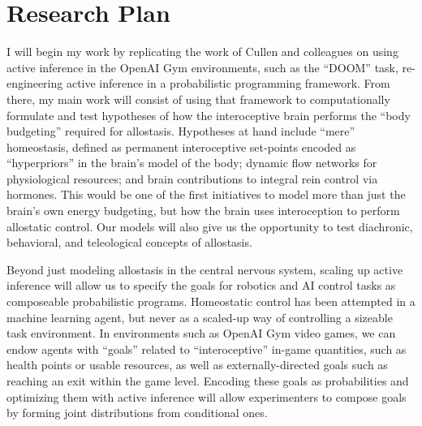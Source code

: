 
\section*{Research Plan}
\begin{singlespace}
\im
I will begin my work by replicating the work of Cullen and colleagues on
using active inference in the OpenAI Gym environments, such as the ``DOOM''
task\cite{Cullen2018}, re-engineering active inference in a probabilistic
programming framework.  From there, my main work will consist of using that
framework to computationally formulate and test hypotheses of how the
interoceptive brain performs the ``body budgeting'' required for allostasis.
Hypotheses at hand include ``mere'' homeostasis, defined as permanent
interoceptive set-points encoded as ``hyperpriors'' in the brain's model of
the body\cite{Morville2018a}; dynamic flow networks for physiological
resources; and brain contributions to integral rein control via hormones\cite{SAUNDERS1998}.  This would be one
of the first initiatives to model more than just the brain's own energy
budgeting, but how the brain uses interoception to perform allostatic
control\cite{Sterling2012,Sterling2015,Christie2015}.  Our models will
also give us the opportunity to test diachronic, behavioral, and teleological
concepts of allostasis\cite{Corcoran2017}.
\end{singlespace}

\begin{singlespace}
\im
Beyond just modeling allostasis in the central nervous system, scaling
up active inference will allow us to specify the goals for robotics and AI
control tasks as composeable probabilistic programs.  Homeostatic control has
been attempted in a machine learning agent, but never as a scaled-up way
of controlling a sizeable task environment\cite{Penny}.  In environments such
as OpenAI Gym video games, we can endow agents with ``goals'' related to
``interoceptive'' in-game quantities, such as health points or usable
resources, as well as externally-directed goals such as reaching an exit
within the game level.  Encoding these goals as probabilities and optimizing
them with active inference will allow experimenters to compose goals by
forming joint distributions from conditional ones.
\end{singlespace}

